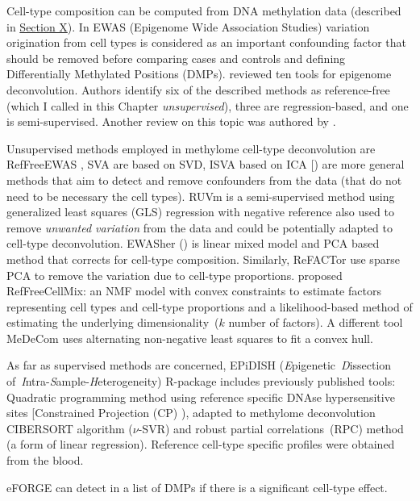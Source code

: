 \documentclass[12pt,]{book}
\theoremstyle{definition}
\theoremstyle{definition}
\theoremstyle{definition}
\theoremstyle{remark}
\begin{document}
Cell-type composition can be computed from DNA methylation data
(described in \protect\hyperlink{epi}{Section X}). In EWAS (Epigenome
Wide Association Studies) variation origination from cell types is
considered as an important confounding factor that should be removed
before comparing cases and controls and defining Differentially
Methylated Positions (DMPs). \citet{Teschendorff2017} reviewed ten tools
for epigenome deconvolution. Authors identify six of the described
methods as reference-free (which I called in this Chapter
\emph{unsupervised}), three are regression-based, and one is
semi-supervised. Another review on this topic was authored by
\citet{Titus2017}.

Unsupervised methods employed in methylome cell-type deconvolution are
RefFreeEWAS \citep{Houseman2014}, SVA \citep{Leek2007} are based on SVD,
ISVA based on ICA {[}\citet{Teschendorff2011}) are more general methods
that aim to detect and remove confounders from the data (that do not
need to be necessary the cell types). RUVm \citep{Maksimovic2015} is a
semi-supervised method using generalized least squares (GLS) regression
with negative reference also used to remove \emph{unwanted variation}
from the data and could be potentially adapted to cell-type
deconvolution. EWASher (\citet{Zou2014}) is linear mixed model and PCA
based method that corrects for cell-type composition. Similarly,
ReFACTor \citep{Rahmani2016} use sparse PCA to remove the variation due
to cell-type proportions. \citet{Houseman2016} proposed RefFreeCellMix:
an NMF model with convex constraints to estimate factors representing
cell types and cell-type proportions and a likelihood-based method of
estimating the underlying dimensionality~(\(k\) number of factors). A
different tool MeDeCom \citep{Lutsik2017} uses alternating non-negative
least squares to fit a convex hull.

As far as supervised methods are concerned, EPiDISH
(\emph{E}pigenetic~\emph{D}issection
of~\emph{I}ntra-\emph{S}ample-\emph{H}eterogeneity) R-package
\citep{Teschendorff2017} includes previously published tools: Quadratic
programming method using reference specific DNAse hypersensitive sites
{[}Constrained Projection (CP) \citep{Houseman2012}), adapted to
methylome deconvolution CIBERSORT algorithm (\(\nu\)-SVR) and robust
partial correlations~(RPC) method (a form of linear regression).
Reference cell-type specific profiles were obtained from the blood.

eFORGE \citep{Breeze2016} can detect in a list of DMPs if there is a
significant cell-type effect.
\end{document}
